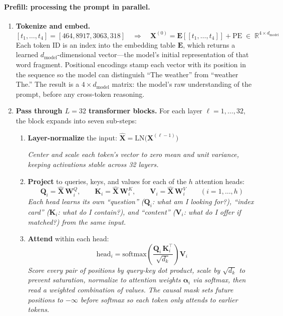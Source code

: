 \paragraph{Prefill: processing the prompt in parallel.}

\begin{enumerate}
    \item \textbf{Tokenize and embed.}
    \[
    [t_1, \ldots, t_4] = [464, 8917, 3063, 318] \quad \Longrightarrow \quad \mathbf{X}^{(0)} = \mathbf{E}[[t_1, \ldots, t_4]] + \text{PE} \;\in\; \mathbb{R}^{4 \times d_{\text{model}}}
    \]
    Each token ID is an index into the embedding table $\mathbf{E}$, which returns a learned $d_{\text{model}}$-dimensional vector---the model's initial representation of that word fragment. Positional encodings stamp each vector with its position in the sequence so the model can distinguish ``The weather'' from ``weather The.'' The result is a $4 \times d_{\text{model}}$ matrix: the model's raw understanding of the prompt, before any cross-token reasoning.

    \item \textbf{Pass through $L = 32$ transformer blocks.} For each layer $\ell = 1, \ldots, 32$, the block expands into seven sub-steps:
    \begin{enumerate}
        \item \textbf{Layer-normalize} the input: \quad $\hat{\mathbf{X}} = \text{LN}\!\big(\mathbf{X}^{(\ell-1)}\big)$

        \emph{Center and scale each token's vector to zero mean and unit variance, keeping activations stable across 32 layers.}

        \item \textbf{Project} to queries, keys, and values for each of the $h$ attention heads:
        \[
        \mathbf{Q}_i = \hat{\mathbf{X}}\,\mathbf{W}_i^Q, \qquad \mathbf{K}_i = \hat{\mathbf{X}}\,\mathbf{W}_i^K, \qquad \mathbf{V}_i = \hat{\mathbf{X}}\,\mathbf{W}_i^V \qquad (i = 1, \ldots, h)
        \]
        \emph{Each head learns its own ``question'' ($\mathbf{Q}_i$: what am I looking for?), ``index card'' ($\mathbf{K}_i$: what do I contain?), and ``content'' ($\mathbf{V}_i$: what do I offer if matched?) from the same input.}

        \item \textbf{Attend} within each head:
        \[
        \text{head}_i = \text{softmax}\!\left(\frac{\mathbf{Q}_i\,\mathbf{K}_i^\top}{\sqrt{d_k}}\right)\mathbf{V}_i
        \]
        \emph{Score every pair of positions by query-key dot product, scale by $\sqrt{d_k}$ to prevent saturation, normalize to attention weights $\boldsymbol{\alpha}_i$ via softmax, then read a weighted combination of values. The causal mask sets future positions to $-\infty$ before softmax so each token only attends to earlier tokens.}


\end{enumerate}
\end{enumerate}
